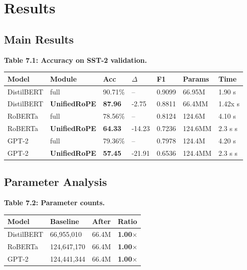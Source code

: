 
\section{Results}

\subsection{Main Results}

\textbf{Table 7.1: Accuracy on SST-2 validation.}

\begin{table}[H]
\centering
\small
\begin{tabular}{lllllll}
\toprule
\textbf{Model} & \textbf{Module} & \textbf{Acc} & \textbf{$\Delta$} & \textbf{F1} & \textbf{Params} & \textbf{Time} \\
\midrule
DistilBERT & full & 90.71\% & -- & 0.9099 & 66.95M & 1.90 s \\
DistilBERT & \textbf{UnifiedRoPE} & \textbf{87.96} & -2.75 & 0.8811 & 66.4MM & 1.42x s \\
RoBERTa & full & 78.56\% & -- & 0.8124 & 124.6M & 4.10 s \\
RoBERTa & \textbf{UnifiedRoPE} & \textbf{64.33} & -14.23 & 0.7236 & 124.6MM & 2.3 s s \\
GPT-2 & full & 79.36\% & -- & 0.7978 & 124.4M & 4.20 s \\
GPT-2 & \textbf{UnifiedRoPE} & \textbf{57.45} & -21.91 & 0.6536 & 124.4MM & 2.3 s s \\
\bottomrule
\end{tabular}
\end{table}

\subsection{Parameter Analysis}

\textbf{Table 7.2: Parameter counts.}

\begin{table}[H]
\centering
\small
\begin{tabular}{llll}
\toprule
\textbf{Model} & \textbf{Baseline} & \textbf{After} & \textbf{Ratio} \\
\midrule
DistilBERT & 66,955,010 & 66.4M & \textbf{1.00$\times$} \\
RoBERTa & 124,647,170 & 66.4M & \textbf{1.00$\times$} \\
GPT-2 & 124,441,344 & 66.4M & \textbf{1.00$\times$} \\
\bottomrule
\end{tabular}
\end{table}


